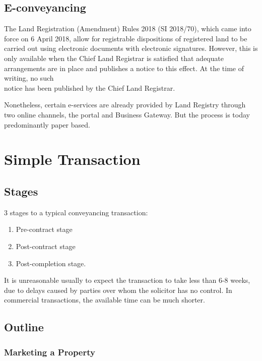 \documentclass[
]{article}
\providecommand{\tightlist}{%
  \setlength{\itemsep}{0pt}\setlength{\parskip}{0pt}}
\begin{document}
\hypertarget{e-conveyancing}{%
\subsection{E-conveyancing}\label{e-conveyancing}}

The Land Registration (Amendment) Rules 2018 (SI 2018/70), which came
into force on 6 April 2018, allow for registrable dispositions of
registered land to be carried out using electronic documents with
electronic signatures. However, this is only available when the Chief
Land Registrar is satisfied that adequate arrangements are in place and
publishes a notice to this effect. At the time of writing, no such\\
notice has been published by the Chief Land Registrar.

Nonetheless, certain e-services are already provided by Land Registry
through two online channels, the portal and Business Gateway. But the
process is today predominantly paper based.

\hypertarget{simple-transaction}{%
\section{Simple Transaction}\label{simple-transaction}}

\hypertarget{stages}{%
\subsection{Stages}\label{stages}}

3 stages to a typical conveyancing transaction:

\begin{enumerate}
\tightlist
\item
  Pre-contract stage
\item
  Post-contract stage
\item
  Post-completion stage.
\end{enumerate}

It is unreasonable usually to expect the transaction to take less than
6-8 weeks, due to delays caused by parties over whom the solicitor has
no control. In commercial transactions, the available time can be much
shorter.

\hypertarget{outline}{%
\subsection{Outline}\label{outline}}

\hypertarget{marketing-a-property}{%
\subsubsection{Marketing a Property}\label{marketing-a-property}}
\end{document}
